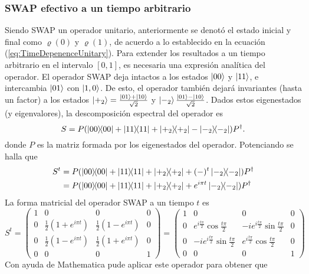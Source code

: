 \subsubsection{SWAP efectivo a un tiempo arbitrario}
Siendo \textsc{SWAP} un operador unitario, anteriormente se denotó el estado inicial y final como $\varrho(0)$ y $\varrho(1)$, de acuerdo a lo establecido en la ecuación (\ref{eq:TimeDepenenceUnitary}). Para extender los resultados a un tiempo arbitrario en el intervalo $[0,1]$, es necesaria una expresión analítica del operador. El operador SWAP deja intactos a los estados $\ket{00}$ y $\ket{11}$, e intercambia $\ket{01}$ con $\ket{1,0}$. De esto, el operador también dejará invariantes (hasta un factor) a los estados $\ket{+_{2}}=\frac{\ket{01}+\ket{10}}{\sqrt{2}}$ y $\ket{-_{2}}\frac{\ket{01}-\ket{10}}{\sqrt{2}}$. Dados estos eigenestados (y eigenvalores), la descomposición espectral del operador es
\begin{equation}\label{eq:SWAPSpectral}
S=P(\dyad{00}+\dyad{11}+\dyad{+_{2}}-\dyad{-_{2}})P^{\dag}.
\end{equation}
donde $P$ es la matriz formada por los eigenestados del operador. Potenciando se halla que
\begin{align}\label{eq:SWAPPower}
S^{t}&=P(\dyad{00}+\dyad{11}+\dyad{+_{2}}+(-)^{t}\dyad{-_{2}})P^{\dag}\\
&=P(\dyad{00}+\dyad{11}+\dyad{+_{2}}+e^{i \pi t}\dyad{-_{2}})P^{\dag}
\end{align}
La forma matricial del operador \textsc{SWAP} a un tiempo $t$ es
\begin{equation}
S^{t}=\begin{pmatrix}
 1 & 0 & 0 & 0 \\
 0 & \frac{1}{2}(1+e^{i \pi t}) & \frac{1}{2} (1-e^{i \pi t}) & 0 \\
 0 & \frac{1}{2}(1-e^{i \pi t}) & \frac{1}{2}(1+e^{i \pi t}) & 0 \\
 0 & 0 & 0 & 1
\end{pmatrix}=\begin{pmatrix}
  1 & 0 & 0 & 0 \\
  0 & e^{i\frac{t\pi}{2}}\cos{\frac{t\pi}{2}} & -ie^{i\frac{t\pi}{2}}\sin{\frac{t\pi}{2}} & 0 \\
  0 & -ie^{i\frac{t\pi}{2}}\sin{\frac{t\pi}{2}} & e^{i\frac{t\pi}{2}}\cos{\frac{t\pi}{2}}  & 0 \\
  0 & 0 & 0 & 1
 \end{pmatrix}
\end{equation}
Con ayuda de Mathematica pude aplicar este operador para obtener que
